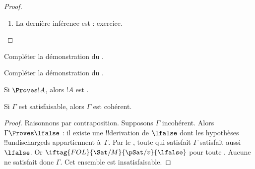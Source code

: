 \documentclass[../../../include/open-logic-section]{subfiles}
\begin{document}
\begin{proof}
\begin{enumerate}
\item La dernière inférence est \Elim{\lnot} : exercice.

\end{enumerate}
\end{proof}

\begin{prob}
Compléter la démonstration du .
\end{prob}
\tagendprob

\begin{prob}
Compléter la démonstration du .
\end{prob}
\tagendprob

\begin{cor}
Si $\Proves !A$, alors $!A$ est .
\end{cor}

\begin{cor}
Si $\Gamma$ est satisfaisable, alors $\Gamma$ est cohérent.
\end{cor}

\begin{proof}
Raisonnons par contraposition. Supposons $\Gamma$ incohérent.
Alors $\Gamma \Proves \lfalse$ : il existe une !!{derivation}
de $\lfalse$ dont les hypothèses !!{undischarged}s appartiennent
à~$\Gamma$. Par le , toute
qui satisfait $\Gamma$ satisfait aussi $\lfalse$.
Or $\iftag{FOL}{\Sat/{M}}{\pSat/{v}}{\lfalse}$ pour toute
.
Aucune 
ne satisfait donc $\Gamma$. Cet ensemble est insatisfaisable.
\end{proof}
%
%
%
%
%
%
%
%
%
%
%
\end{document}

